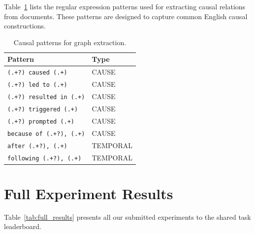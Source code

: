 \documentclass[11pt]{article}
\begin{document}
Table~\ref{tab:patterns} lists the regular expression patterns used for extracting causal relations from documents. These patterns are designed to capture common English causal constructions.

\begin{table}[h]
\centering
\small
\begin{tabular}{ll}
\toprule
\textbf{Pattern} & \textbf{Type} \\
\midrule
\texttt{(.+?) caused (.+)} & CAUSE \\
\texttt{(.+?) led to (.+)} & CAUSE \\
\texttt{(.+?) resulted in (.+)} & CAUSE \\
\texttt{(.+?) triggered (.+)} & CAUSE \\
\texttt{(.+?) prompted (.+)} & CAUSE \\
\texttt{because of (.+?), (.+)} & CAUSE \\
\texttt{after (.+?), (.+)} & TEMPORAL \\
\texttt{following (.+?), (.+)} & TEMPORAL \\
\bottomrule
\end{tabular}
\caption{Causal patterns for graph extraction.}
\label{tab:patterns}
\end{table}

\section{Full Experiment Results}
\label{app:full_results}

Table~\ref{tab:full_results} presents all our submitted experiments to the shared task leaderboard.
\end{document}
